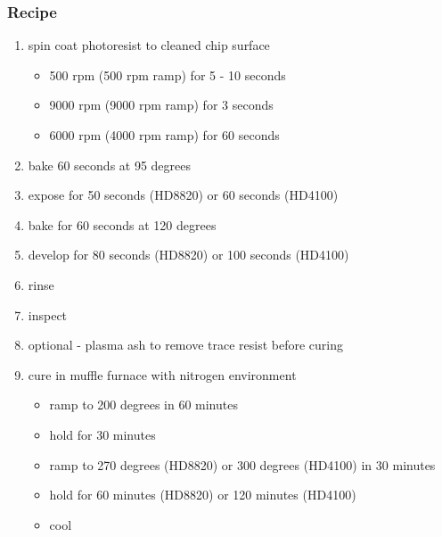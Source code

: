 \subsubsection{Recipe}
\begin{enumerate}
	\item spin coat photoresist to cleaned chip surface
	\begin{itemize}
		\item 500 rpm (500 rpm ramp) for 5 - 10 seconds
		\item 9000 rpm (9000 rpm ramp) for 3 seconds
		\item 6000 rpm (4000 rpm ramp) for 60 seconds
	\end{itemize}
	\item bake 60 seconds at 95 degrees
	\item expose for 50 seconds (HD8820) or 60 seconds (HD4100)
	\item bake for 60 seconds at 120 degrees
	\item develop for 80 seconds (HD8820) or 100 seconds (HD4100)
	\item rinse
	\item inspect
	\item optional - plasma ash to remove trace resist before curing
	\item cure in muffle furnace with nitrogen environment
	\begin{itemize}
		\item ramp to 200 degrees in 60 minutes
		\item hold for 30 minutes
		\item ramp to 270 degrees (HD8820) or 300 degrees (HD4100) in 30 minutes
		\item hold for 60 minutes (HD8820) or 120 minutes (HD4100)
		\item cool
	\end{itemize}
\end{enumerate}



